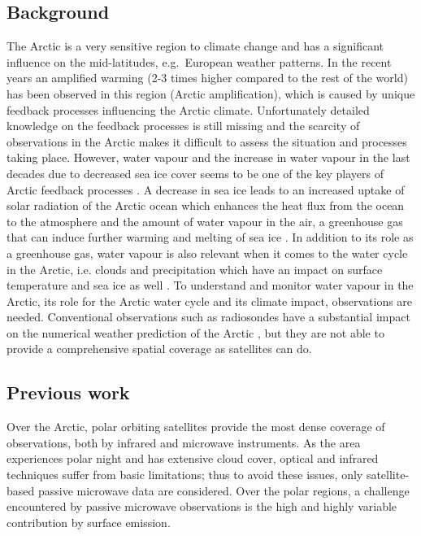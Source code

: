 \documentclass[12pt,oneside,a4paper]{article}
\begin{document}
\subsection{Background}
%
\label{sec:background}
The Arctic is a very sensitive region to climate change and has a significant
influence on the mid-latitudes, e.g.\ European weather patterns. In the recent
years an amplified warming (2-3 times higher compared to the rest of the world)
has been observed in this region (Arctic amplification), which is caused by
unique feedback processes influencing the Arctic climate. Unfortunately
detailed knowledge on the feedback processes is still missing and the scarcity
of observations in the Arctic makes it difficult to assess the situation and
processes taking place. However, water vapour and the increase in water vapour
in the last decades due to decreased sea ice cover seems to be one of the key
players of Arctic feedback processes \citep[e.g.][]{ vihma:2016:theat}. A decrease in sea ice leads to an increased uptake of solar
radiation of the Arctic ocean which enhances the heat flux from the ocean to
the atmosphere and the amount of water vapour in the air, a greenhouse gas that
can induce further warming and melting of sea ice \citep{screen:2010:thece}. In
addition to its role as a greenhouse gas, water vapour is also relevant when it
comes to the water cycle in the Arctic, i.e. clouds and precipitation which
have an impact on surface temperature and sea ice as well
\citep{blanchet:water:1995}. To understand and monitor water vapour in the
Arctic, its role for the Arctic water cycle and its climate impact,  observations
are needed. Conventional observations such as radiosondes have a substantial
impact on the numerical weather prediction of the Arctic
\citep{lawrence:2019:usean}, but they are not able to provide a comprehensive
spatial coverage as satellites can do.

\subsection{Previous work}
%
\label{sec:previousworks}
%
Over the Arctic, polar orbiting satellites provide the most dense coverage
of observations, both by infrared and microwave instruments. As the area
experiences polar night and has extensive cloud cover, optical and infrared
techniques suffer from basic limitations; thus to avoid these issues, only
satellite-based passive microwave data are considered. Over the polar regions, a
challenge encountered by passive microwave observations is the high and highly
variable contribution by surface emission.
\end{document}
